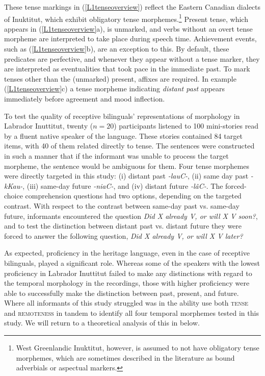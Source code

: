 \documentclass[output=paper,colorlinks,citecolor=brown,footheight=42pt]{langscibook}
\begin{document}
\noindent
These tense markings in (\ref{L1tenseoverview}) reflect the Eastern Canadian dialects of Inuktitut, which exhibit obligatory tense morphemes.\footnote{West Greenlandic Inuktitut, however, is assumed to not have obligatory tense morphemes, which are sometimes described in the literature as bound adverbials or aspectual markers.} Present tense, which appears in (\ref{L1tenseoverview}a), is unmarked, and verbs without an overt tense morpheme are interpreted to take place during speech time. Achievement events, such as (\ref{L1tenseoverview}b), are an exception to this. By default, these predicates are perfective, and whenever they appear without a tense marker, they are interpreted as eventualities that took pace in the immediate past. To mark tenses other than the (unmarked) present, affixes are required. In example (\ref{L1tenseoverview}c) a tense morpheme indicating \emph{distant past} appears immediately before agreement and mood inflection.

To test the quality of receptive bilinguals' representations of morphology in Labrador Inuttitut, twenty ($n=20$) participants listened to 100 mini-stories read by a fluent native speaker of the language. These stories contained 84 target items, with 40 of them related directly to tense. The sentences were constructed in such a manner that if the informant was unable to process the target morpheme, the sentence would be ambiguous for them. Four tense morphemes were directly targeted in this study: (i) distant past \textit{-lauC-}, (ii) same day past \textit{-kKau-}, (iii) same-day future \textit{-niaC-}, and (iv) distant future \textit{-l\^{a}C-}. The forced-choice comprehension questions had two options, depending on the targeted contrast. With respect to the contrast between same-day past vs. same-day future, informants encountered the question \textit{Did X already V, or will X V soon?}, and to test the distinction between distant past vs. distant future they were forced to answer the following question, \textit{Did X already V, or will X V later?}

As expected, proficiency in the heritage language, even in the case of receptive bilinguals, played a significant role. Whereas some of the speakers with the lowest proficiency in Labrador Inuttitut failed to make any distinctions with regard to the temporal morphology in the recordings, those with higher proficiency were able to successfully make the distinction between past, present, and future. Where all informants of this study struggled was in the ability use both \textsc{tense} and \textsc{remoteness} in tandem to identify all four temporal morphemes tested in this study. We will return to a theoretical analysis of this in  below.
\end{document}
